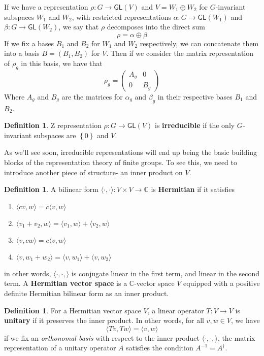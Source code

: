 \documentclass[psamsfonts]{amsart}
\theoremstyle{definition}
\newtheorem{defn}[thm]{Definition}
\theoremstyle{remark}
\newcommand{\C}{\mathbb{C}}
\newcommand{\GL}{\mathsf{GL}}
\newcommand{\inv}{^{-1}}
\newcommand{\set}[1]{\left\lbrace#1 \right\rbrace}
\begin{document}
If we have a representation $\rho: G \to \GL(V)$ and $V = W_1 \oplus W_2$ for $G$-invariant subspaces $W_1$ and $W_2$, with restricted representations $\alpha: G \to \GL(W_1)$ and $\beta: G \to \GL(W_2)$, we say that $\rho$ decomposes into the direct sum
$$\rho = \alpha \oplus \beta $$
If we fix a bases $B_1$ and $B_2$ for $W_1$ and $W_2$ respectively, we can concatenate them into a basis $B = (B_1, B_2)$ for $V$. Then if we consider the matrix representation of $\rho_g$ in this basis, we have that 
$$\rho_g = \begin{pmatrix}
A_g & 0 \\
0 & B_g
\end{pmatrix} $$
Where $A_g$ and $B_g$ are the matrices for $\alpha_g$ and $\beta_g$ in their respective bases $B_1$ and $B_2$.

\begin{defn}
Z representation $\rho: G \to \GL(V)$ is \textbf{irreducible} if the only $G$-invariant subspaces are $\set{0}$ and $V$.
\end{defn}

As we'll see soon, irreducible representations will end up being the basic building blocks of the representation theory of finite groups. To see this, we need to introduce another piece of structure- an inner product on $V$.

\begin{defn}
A bilinear form $\langle\cdot,\cdot \rangle: V\times V \to \C$ is \textbf{Hermitian} if it satisfies
\begin{enumerate}
\item $\langle cv, w \rangle = \overline{c}\langle v, w \rangle$
\item $\langle v_1 + v_2, w \rangle = \langle v_1, w \rangle + \langle v_2, w \rangle$
\item $\langle v, cw \rangle = c\langle v, w \rangle$
\item $\langle v, w_1 + w_2 \rangle = \langle v, w_1 \rangle + \langle v, w_2 \rangle$
\end{enumerate}
in other words, $\langle \cdot,\cdot, \rangle$ is conjugate linear in the first term, and linear in the second term. A \textbf{Hermitian vector space} is a $\C$-vector space $V$ equipped with a positive definite Hermitian bilinear form as an inner product.
\end{defn}

\begin{defn}
For a Hermitian vector space $V$, a linear operator $T: V\to V$ is \textbf{unitary} if it preserves the inner product. In other words, for all $v,w \in V$, we have
$$\langle Tv, Tw \rangle = \langle v,w \rangle $$
if we fix an \emph{orthonomal basis} with respect to the inner product $\langle \cdot, \cdot, \rangle$, the matrix representation of a unitary operator $A$ satisfies the condition $A\inv = A^\dagger$. 
\end{defn}
\end{document}
